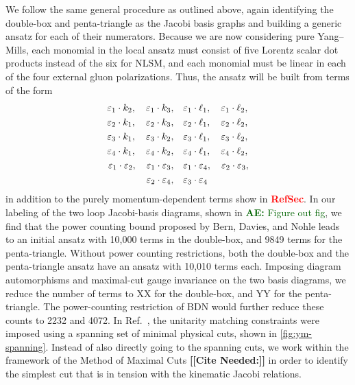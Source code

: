 \documentclass[11pt,letter]{article}
\newcommand{\ace}[1]{\textcolor{darkgreen}{\textbf{AE:}{ #1}}}
\def\pol{\varepsilon}
\newcommand{\citepls}[1]{{\bf\color{red}[[Cite Needed:#1]]}}
\newcommand{\sect}{\textbf{\textcolor{red}{RefSec}}}
\begin{document}
We follow the same general procedure as outlined above, again
identifying the double-box and penta-triangle as the Jacobi basis
graphs and building a generic ansatz for each of their numerators.
Because we are now considering pure Yang--Mills, each monomial in the
local ansatz must consist of five Lorentz scalar dot products instead
of the six for NLSM, and each monomial must be linear in each of the
four external gluon polarizations.  Thus, the ansatz will be built
from terms of the form
\begin{align}
  \pol_1 \cdot k_2, \quad \pol_1 \cdot k_3, \quad& \pol_1 \cdot \ell_1, \quad \pol_1 \cdot \ell_2, \notag \\
  \pol_2 \cdot k_1, \quad \pol_2 \cdot k_3, \quad& \pol_2 \cdot \ell_1, \quad \pol_2 \cdot \ell_2, \notag \\
  \pol_3 \cdot k_1, \quad \pol_3 \cdot k_2, \quad& \pol_3 \cdot \ell_1, \quad \pol_3 \cdot \ell_2,  \\
  \pol_4 \cdot k_1, \quad \pol_4 \cdot k_2, \quad& \pol_4 \cdot \ell_1, \quad \pol_4 \cdot \ell_2, \notag \\
  \pol_1 \cdot \pol_2, \quad \pol_1 \cdot \pol_3, \quad& \pol_1 \cdot \pol_4, \quad \pol_2 \cdot \pol_3, \notag \\
  \pol_2 \cdot \pol_4, \quad& \pol_3 \cdot \pol_4  \notag
\end{align}
in addition to the purely momentum-dependent terms show in \sect{}.
In our labeling of the two loop Jacobi-basis diagrams, shown in
\ace{Figure out fig}, we find that the power counting bound proposed
by Bern, Davies, and Nohle leads to an initial ansatz with 10,000
terms in the double-box, and 9849 terms for the penta-triangle.
Without power counting restrictions, both the double-box and the
penta-triangle ansatz have an ansatz with 10,010 terms each.  Imposing
diagram automorphisms and maximal-cut gauge invariance on the two
basis diagrams, we reduce the number of terms to XX for the
double-box, and YY for the penta-triangle.  The power-counting
restriction of BDN would further reduce these counts to 2232 and 4072.
In Ref.~\cite{Bern:2015ooa}, the unitarity matching constraints were
imposed using a spanning set of minimal physical cuts, shown in
\cref{fig:ym-spanning}.  Instead of also directly going to the
spanning cuts, we work within the framework of the Method of Maximal
Cuts \citepls{} in order to identify the simplest cut that is in
tension with the kinematic Jacobi relations.
\end{document}

